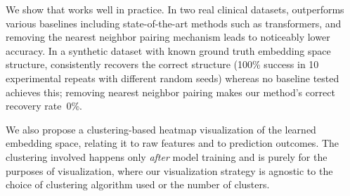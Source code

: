 We show that  works well in practice.
In two real clinical datasets,  outperforms various baselines including state-of-the-art methods such as transformers, and removing the nearest neighbor pairing mechanism leads to noticeably lower accuracy.
In a synthetic dataset with known ground truth embedding space structure, \mbox{} consistently recovers the correct structure (100\% success in 10 experimental repeats with different random seeds) whereas no baseline tested achieves this; removing nearest neighbor pairing makes our method's correct recovery rate~0\%.

We also propose a clustering-based heatmap visualization of the learned embedding space, relating it to raw features and to prediction outcomes.
The clustering involved happens only \emph{after} model training and is purely for the purposes of visualization, where our visualization strategy is agnostic to the choice of clustering algorithm used or the number of clusters.


